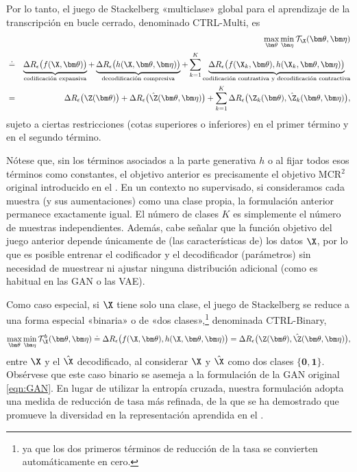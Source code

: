 \documentclass[../../book-main_es.tex]{subfiles}
\begin{document}
Por lo tanto, el juego de Stackelberg «multiclase» global para el aprendizaje de la
transcripción en bucle cerrado, denominado CTRL-Multi, es
\begin{eqnarray}
    &&\max_{\bm \theta} \min_{\bm \eta} \mathcal{T}_{\X}(\bm \theta,
    \bm \eta) \\
    &\doteq& \underbrace{\Delta R_\epsilon\big(f(\X,\bm
    \theta)\big)}_{\text{codificación expansiva}} + \underbrace{\Delta
        R_\epsilon\big(h(\X,\bm \theta, \bm
    \eta)\big)}_{\text{decodificación compresiva}} + \sum_{k=1}^K
    \underbrace{\Delta R_\epsilon\big(f(\X_k,\bm \theta), h(\X_k,\bm
    \theta,\bm \eta)\big)}_{\text{codificación contrastiva y decodificación
    contractiva}}   \\
    &=& \Delta R_\epsilon\big(\Z(\bm \theta) \big) + \Delta
    R_\epsilon\big(\hat \Z(\bm \theta, \bm \eta)\big) + \sum_{k=1}^K
    \Delta R_\epsilon\big(\Z_k(
    \bm \theta), \hat \Z_k(\bm \theta, \bm \eta) \big),
    \label{eq:MCR2-GAN-objective}
\end{eqnarray}
sujeto a ciertas restricciones (cotas superiores o inferiores) en el primer
término y en el segundo término.

Nótese que, sin los términos asociados a la parte generativa
$h$ o al fijar todos esos términos como constantes, el objetivo anterior es
precisamente el objetivo MCR$^2$ original introducido en el
. En un contexto no supervisado, si consideramos cada
muestra (y sus aumentaciones) como una clase propia, la formulación anterior
permanece exactamente igual. El número de clases $K$ es
simplemente el número de muestras independientes. Además, cabe señalar que
la función objetivo del juego anterior depende únicamente de (las características de) los
datos $\X$, por lo que es posible entrenar el codificador y el decodificador (parámetros)
sin necesidad de muestrear ni ajustar ninguna distribución adicional
(como es habitual en las GAN o las VAE).

Como caso especial, si $\X$ tiene solo una clase, el juego de Stackelberg
se reduce a una forma especial «binaria» o de «dos clases»,\footnote{ya que
los dos primeros términos de reducción de la tasa se convierten automáticamente en cero.} denominada CTRL-Binary,
\begin{equation}
    \max_{\bm \theta} \min_{\bm \eta} \mathcal{T}^b_{\X}(\bm \theta,
    \bm \eta) \doteq \Delta R_\epsilon\big(f(\X,\bm \theta), h(\X,\bm
    \theta,\bm \eta)\big) = \Delta R_\epsilon\big(\Z(\bm \theta),
    \hat \Z(\bm \theta, \bm \eta)\big),
    \label{eq:MCR2-GAN-objective-binary}
\end{equation}
entre $\X$ y el $\hat\X$ decodificado, al considerar $\X$ y $\hat\X$
como dos clases $\{\bm 0, \bm 1\}$. Obsérvese que este caso binario
se asemeja a la formulación de la GAN original \eqref{eqn:GAN}.
En lugar de utilizar la entropía cruzada, nuestra formulación adopta una medida de
reducción de tasa más refinada, de la que se ha demostrado que promueve la diversidad en
la representación aprendida en el . %
\end{document}

